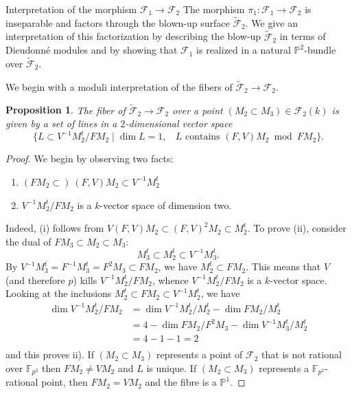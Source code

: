 \documentclass[11pt]{amsart}
\numberwithin{equation}{section}
\newcommand{\FF}{\mathbb F}
\newcommand{\PP}{\mathbb P}
\newtheorem{proposition}[theorem]{Proposition}
\theoremstyle{definition}
\theoremstyle{remark}
\begin{document}
\begin{section}{Interpretation of the
morphism $\mathcal{F}_1 \to \mathcal{F}_2$}
The morphism $\pi_1: \mathcal{F}_1 \to \mathcal{F}_2$ is
inseparable and factors through the blown-up surface $\tilde{\mathcal{F}}_2$.
We give an interpretation of this factorization
by describing the blow-up
$\tilde{\mathcal{F}}_2$ in terms of Dieudonn\'e modules and by showing
that $\mathcal{F}_1$ is realized in a natural ${\PP}^2$-bundle
over $\tilde{\mathcal{F}}_2$.

 We begin with
a moduli interpretation of the fibers of 
$\tilde{\mathcal{F}}_2\to \mathcal{F}_2$.
\begin{proposition}\label{FiberOfBlowUp}
The fiber
of $\tilde{\mathcal{F}}_2 \to \mathcal{F}_2$ over a point 
$(M_2\subset M_3) \in {\mathcal{F}}_2(k)$ is given by a set
of lines in a $2$-dimensional vector space 
$$
\{L \subset V^{-1}M_2^t/FM_2 \mid \dim L = 1,\ 
\text{ $L$ contains $(F,V)M_2 \bmod FM_2$} \}.
$$
\end{proposition}
\begin{proof}
We begin by observing two facts:
\begin{enumerate}
\item[(i)] $(FM_2 \subset)\ (F,V)M_2 \subset V^{-1}M_2^t$
\item[(ii)] $V^{-1}M_2^t/FM_2$ is a $k$-vector space of dimension two.
\end{enumerate}
Indeed, (i) follows from $V(F,V) M_2 \subset (F,V)^2 M_2 \subset M_2^t$.
To prove (ii), consider  the dual of $FM_3 \subset M_2 \subset M_3$:
\[
M_3^t \subset M_2^t \subset V^{-1}M_3^t.
\]
By $V^{-1}M_3^t = F^{-1}M_3^t = F^2M_3 \subset FM_2$, we have $M_2^t \subset FM_2$.
This means that $V$ (and therefore $p$) kills  $V^{-1}M_2^t/FM_2$,
whence $V^{-1}M_2^t/FM_2$ is a $k$-vector space.
Looking at the inclusions $M_2^t \subset FM_2 \subset V^{-1}M_2^t$, we have
$$
\begin{aligned}
\dim V^{-1}M_2^t/FM_2 &= \dim V^{-1}M_2^t/M_2^t - \dim FM_2/M_2^t\\
&= 4- \dim FM_2/F^2M_3 - \dim V^{-1}M_3^t/M_2^t\\
&= 4-1-1 = 2 \\
\end{aligned}
$$
and this proves ii).
If $(M_2 \subset M_3)$ represents a point of $\mathcal{F}_2$ that is not
rational over ${\FF}_{p^2}$ then $FM_2\neq VM_2$ and $L$ is unique.
If $(M_2 \subset M_3)$ represents a ${\FF}_{p^2}$-rational point, then
$FM_2=VM_2$ and the fibre is a ${\PP}^1$. 
\end{proof}


\end{section}
\end{document}
